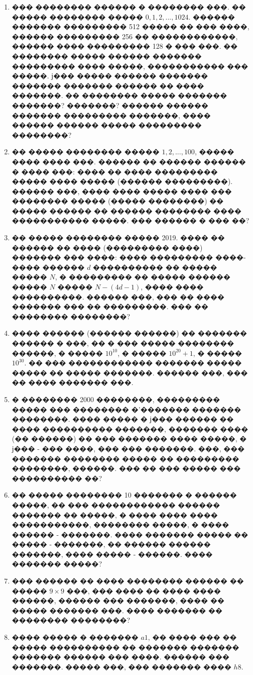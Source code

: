 \documentclass[a4paper,12pt]{article}
\begin{document}
\begin{enumerate}
\item ��� �������� ������ � �������� ���. �� ����� �������� ����� $0,1,2,...,1024$. ������ ������� ��������� 512 ����� �� ��� ����, ������ ��������� 256 �� ������������, ������ ���� ��������� 128 � ��� ���. �� �������� ����� ������ ������� ��������� ���� �����, ����������� ��� �����. ϳ��� ����� ������ ������� ������� ������� ������ �� ���� �������. �� �������� ����� ������� �������? �������? ������ ������ ������� ��������� �������, ���� ������ ������ ����� ��������� ��������?

\item �� ����� �������� ����� $1,2,...,100$, ����� ���� ���� ���. ������ �� ������ ������ � ���� ���: ���� �� ���� ��������� ����� ���� ����� (������ ���������). ������ ���, ���� ���� ����� ���� ��� �������� ����� (����� ��������) �� ����� ������ �� ������ �������� ���� ����������� �����. ��� ������ � ��� ��?

\item �� ����� �������� ����� 2019. ���� �� ������ �� ���� (��������� ����) ������� ��� ����: ���� ��������� ����-���� ������ $d$ ���������� �� ����� ����� $N$,  � ��������� �� ����� ������ ����� $N$ ����� $N-(4d-1)$, ���� ���� ����������. ������ ���, ��� �� ���� ������� ��� �� ���������. ��� �� �������� ��������?

\item ���� ������ (������ ������) �� ������� ������ � ���, �� � ��� ����� �������� ������, � ����� $10^{10}$, � ����� $10^{20}+1$, � ����� $10^{30}$. �� ��� ������������ ������� ����� ����� �� ����� �������. ������ ���, ��� �� ���� ������� ���.

\item � �������� 2000 ��������, ��������� ����� ��� �������� �'������� ������� ��������. ���� ����� � ϳ��� ������ �� ���� ���������� �������, ������� ���� (�� ������) �� ��� ������� ���� �����, � ϳ��� - ��� ����, ��� ��� �������. ���, ��� ������� �������� ����� �� ��������� ��������, ������. ��� �� ��� ����� ��� ���������� ��?

\item �� ����� �������� 10 ������� � ������ �����, �� ��� ������������ ������ ������� �� �����, � ���� ���� ���� �����������, �������� �����, � ���� ������ - �������. ���� ������� ����� �� ����� - �������, �� ������ ������ �������, ���� ����� - ������. ���� ������� �����?

\item ��� ������ �� ���� �������� ������ �� ����� $9\times 9$ ���, ��� ���� �� ���� ���� ������, ������ ��� �������, ���� �� ����� ������� ���. ���� ������� �� �������� ��������?

\item ���� ����� � ������� $a1$, �� ���� ��� �� ����� ���������� �� ������� ������� ������� ������ ��� ����. ������ ��� �������. ����� ���, ��� ������� ���� $h8$.
\end{enumerate}
\end{document}
